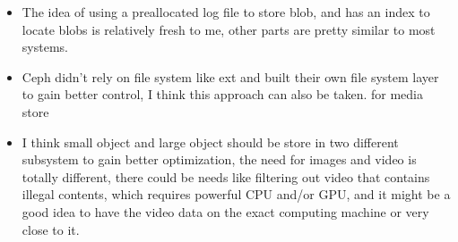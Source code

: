 \documentclass[12pt,a4paper,oneside]{article}
\begin{document}
\begin{itemize}
  \item The idea of using a preallocated log file to store blob, and has an index to locate blobs is relatively fresh to me, other parts are pretty similar to most systems.
  \item Ceph didn't rely on file system like ext and built their own file system layer to gain better control, I think this approach can also be taken.
  for media store
  \item I think small object and large object should be store in two different subsystem to gain better optimization, the need for images and video is totally different,
  there could be needs like filtering out video that contains illegal contents, which requires powerful CPU and/or GPU, and it might be a good idea to have the video data on
  the exact computing machine or very close to it.
\end{itemize}
\end{document}
